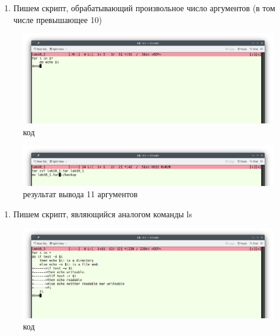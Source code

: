 \begin{enumerate}
\def\labelenumi{\arabic{enumi}.}
\setcounter{enumi}{1}
\tightlist
\item
  Пишем скрипт, обрабатывающий произвольное число аргументов (в том
  числе превышающее 10)
\end{enumerate}

\begin{figure}
\hypertarget{fig:004}{%
\centering
\includegraphics[width=1\textwidth,height=\textheight]{image/4.png}
\caption{код}\label{fig:004}
}
\end{figure}

\begin{figure}
\hypertarget{fig:005}{%
\centering
\includegraphics[width=1\textwidth,height=\textheight]{image/1.png}
\caption{результат вывода 11 аргументов}\label{fig:005}
}
\end{figure}

\begin{enumerate}
\def\labelenumi{\arabic{enumi}.}
\setcounter{enumi}{2}
\tightlist
\item
  Пишем скрипт, являющийся аналогом команды ls
\end{enumerate}

\begin{figure}
\hypertarget{fig:006}{%
\centering
\includegraphics[width=1\textwidth,height=\textheight]{image/6.png}
\caption{код}\label{fig:006}
}
\end{figure}

